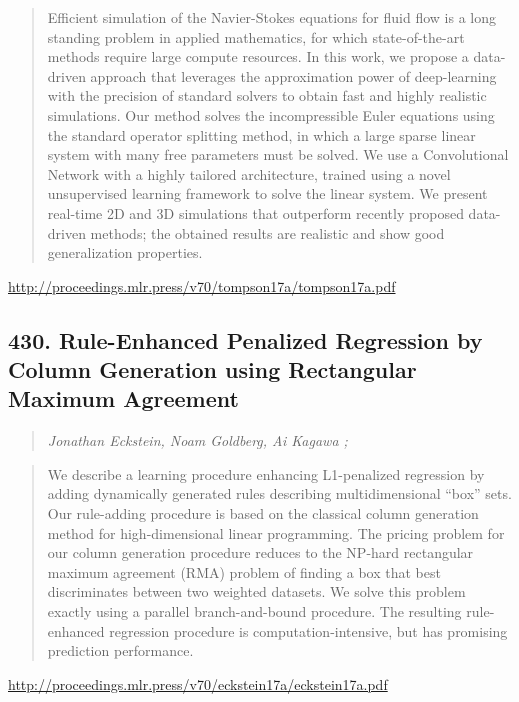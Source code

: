 \documentclass{article}
\begin{document}
\begin{quote}
    Efficient simulation of the Navier-Stokes equations for fluid flow is a long standing problem in applied mathematics, for which state-of-the-art methods require large compute resources. In this work, we propose a data-driven approach that leverages the approximation power of deep-learning with the precision of standard solvers to obtain fast and highly realistic simulations. Our method solves the incompressible Euler equations using the standard operator splitting method, in which a large sparse linear system with many free parameters must be solved. We use a Convolutional Network with a highly tailored architecture, trained using a novel unsupervised learning framework to solve the linear system. We present real-time 2D and 3D simulations that outperform recently proposed data-driven methods; the obtained results are realistic and show good generalization properties.  
\end{quote}

\href{http://proceedings.mlr.press/v70/tompson17a/tompson17a.pdf}{http://proceedings.mlr.press/v70/tompson17a/tompson17a.pdf}

\subsection{430. Rule-Enhanced Penalized Regression by Column Generation using Rectangular Maximum Agreement}

\begin{quote}
\footnotesize{\textit{Jonathan Eckstein, Noam Goldberg, Ai Kagawa ;}}

\end{quote}

\begin{quote}
    We describe a learning procedure enhancing L1-penalized regression by adding dynamically generated rules describing multidimensional “box” sets. Our rule-adding procedure is based on the classical column generation method for high-dimensional linear programming. The pricing problem for our column generation procedure reduces to the NP-hard rectangular maximum agreement (RMA) problem of finding a box that best discriminates between two weighted datasets. We solve this problem exactly using a parallel branch-and-bound procedure. The resulting rule-enhanced regression procedure is computation-intensive, but has promising prediction performance.  
\end{quote}

\href{http://proceedings.mlr.press/v70/eckstein17a/eckstein17a.pdf}{http://proceedings.mlr.press/v70/eckstein17a/eckstein17a.pdf}
\end{document}
